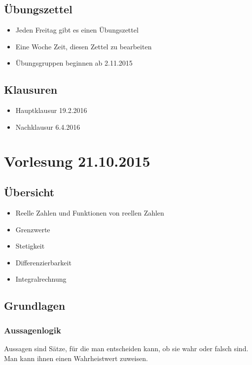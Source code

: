 \documentclass[pdftex,12pt,a4paper,fleqn]{scrartcl}
\begin{document}
\subsection{Übungszettel} %
\label{sub:_bungszettel}
\begin{itemize}
	\item Jeden Freitag gibt es einen Übungszettel
	\item Eine Woche Zeit, diesen Zettel zu bearbeiten
	\item Übungsgruppen beginnen ab 2.11.2015
\end{itemize}

\subsection{Klausuren} %
\label{sub:klausuren}
\begin{itemize}
	\item Hauptklausur 19.2.2016
	\item Nachklausur 6.4.2016
\end{itemize}

\newpage

\section{Vorlesung 21.10.2015} %
\label{sec:vorlesung_21_10_2015}

\subsection{Übersicht} %
\label{sub:_bersicht}
\begin{itemize}
	\item Reelle Zahlen und Funktionen von reellen Zahlen
	\item Grenzwerte
	\item Stetigkeit
	\item Differenzierbarkeit
	\item Integralrechnung
\end{itemize}

\subsection{Grundlagen} %
\label{sub:grundlagen}
\subsubsection{Aussagenlogik} %
\label{ssub:aussagenlogik}
Aussagen sind Sätze, für die man entscheiden kann, ob sie wahr oder falsch sind.
Man kann ihnen einen Wahrheistwert zuweisen.
\end{document}
